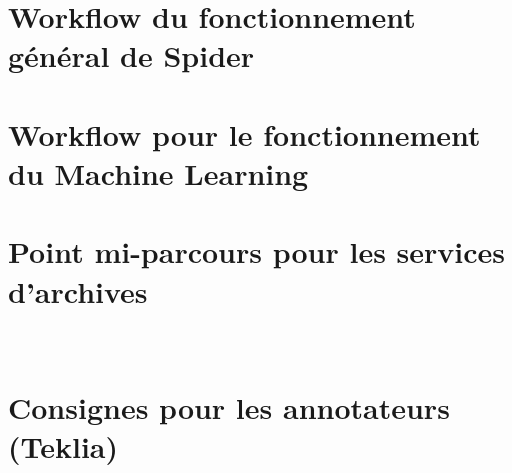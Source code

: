\documentclass[a4paper,12pt,twoside]{book}
\begin{document}
\chapter[Fonctionnement Général de Spider - Workflow]{Workflow du fonctionnement général de Spider}


\chapter[Machine Learning workflow]{Workflow pour le fonctionnement du Machine Learning}


\chapter[Point mi-parcours pour les services d'archives]{Point mi-parcours pour les services d'archives}
\

\chapter[Consignes pour les annotateurs (Teklia)]{Consignes pour les annotateurs (Teklia)}



\newpage{\pagestyle{empty}\cleardoublepage}


\backmatter %

\printglossaries
\newpage{\pagestyle{empty}\cleardoublepage}

\listoftables
\newpage{\pagestyle{empty}\cleardoublepage}

\listoffigures
\newpage{\pagestyle{empty}\cleardoublepage}

\tableofcontents
\newpage{\pagestyle{empty}\cleardoublepage}
\end{document}
